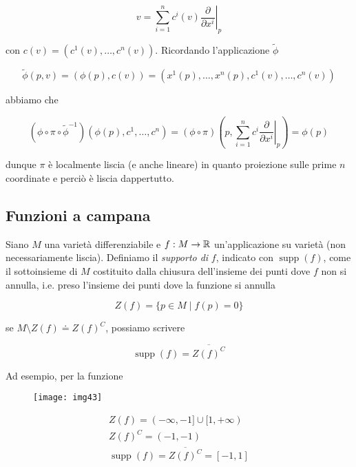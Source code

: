 \begin{equation}
	v = \sum_{i=1}^{n} c^{i}(v) \left. \dfrac{\partial}{\partial x^{i}} \right|_{p}
\end{equation}

con $ c(v) = (c^{1}(v),\dots,c^{n}(v)) $. Ricordando l'applicazione $ \tilde{\phi} $

\begin{equation}
	\tilde{\phi}(p,v) = (\phi(p),c(v)) = (x^{1}(p),\dots,x^{n}(p),c^{1}(v),\dots,c^{n}(v))
\end{equation}

abbiamo che

\begin{equation}
	(\phi \circ \pi \circ \tilde{\phi}^{-1}) (\phi(p),c^{1},\dots,c^{n}) = (\phi \circ \pi) \left( p, \sum_{i=1}^{n} c^{i} \left. \dfrac{\partial}{\partial x^{i}} \right|_{p} \right) = \phi(p)
\end{equation}

dunque $ \pi $ è localmente liscia (e anche lineare) in quanto proiezione sulle prime $ n $ coordinate e perciò è liscia dappertutto.

\subsection{Funzioni a campana}

Siano $ M $ una varietà differenziabile e $ f : M \to \mathbb{R} $ un'applicazione su varietà (non necessariamente liscia). Definiamo il \textit{supporto di} $ f $, indicato con $ \operatorname{supp}(f) $, come il sottoinsieme di $ M $ costituito dalla chiusura dell'insieme dei punti dove $ f $ non si annulla, i.e. preso l'insieme dei punti dove la funzione si annulla

\begin{equation}
	Z(f) = \{ p \in M \mid f(p) = 0 \}
\end{equation}

se $ M \setminus Z(f) \doteq Z(f)^{C} $, possiamo scrivere

\begin{equation}
	\operatorname{supp}(f) = \overline{Z(f)^{C}}
\end{equation}

Ad esempio, per la funzione 

\begin{figure}[H]
	\centering
	\texttt{[image: img43]}
\end{figure}

\begin{gather}
	Z(f) = (-\infty,-1] \cup [1,+\infty)\\
	Z(f)^{C} = (-1,-1)\\
	\operatorname{supp}(f) = \overline{Z(f)^{C}} = [-1,1]
\end{gather}

